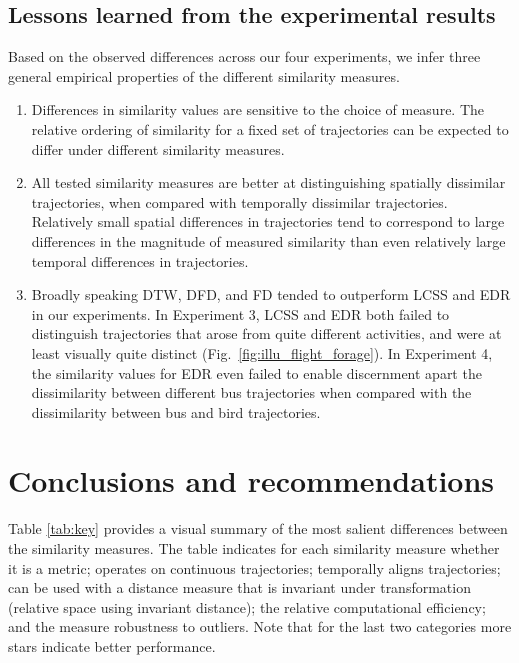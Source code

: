 \documentclass{interact}
\begin{document}
\subsection{Lessons learned from the experimental results}

Based on the observed differences across our four experiments, we infer three general empirical properties of the different similarity measures.

\begin{enumerate}

\item Differences in similarity values are sensitive to the choice of measure. The relative ordering of similarity  for a fixed set of trajectories can be expected to differ under different similarity measures.

\item All tested similarity measures are better at distinguishing spatially dissimilar trajectories, when compared with temporally dissimilar trajectories. Relatively small spatial differences in trajectories tend to correspond to large differences in the magnitude of  measured similarity than even  relatively large temporal differences in trajectories.

\item Broadly speaking DTW, DFD, and FD tended to outperform LCSS and EDR in our experiments.  In Experiment 3, LCSS and EDR both failed to distinguish trajectories that arose from quite different activities, and were at least visually quite distinct (Fig.~\ref{fig:illu_flight_forage}). In Experiment 4, the similarity values for EDR even failed to enable discernment apart the dissimilarity between different bus trajectories when compared with the dissimilarity between bus and bird trajectories.
\end{enumerate}
 	
\section{Conclusions and recommendations}
\label{sec:discussion}



Table \ref{tab:key} provides a visual summary of the most salient differences between the similarity measures. The table  indicates for each similarity measure whether it is a metric; operates on continuous trajectories; temporally aligns trajectories; can be used with a distance measure that is invariant under transformation (relative space using invariant distance); the relative computational efficiency;  and the measure robustness to outliers. Note that for the last two categories more stars indicate better performance.
\end{document}
